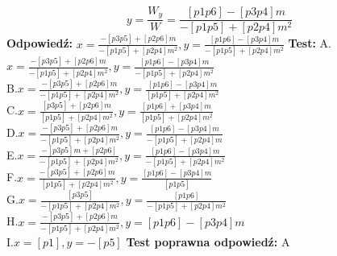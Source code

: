 \documentclass[12pt, a4paper]{article}
\theoremstyle{definition} %
\newcommand{\rozwStop}{\newline}                                            %
\newcommand{\odpStart}{\noindent \textbf{Odpowiedź:}\newline}    %
\newcommand{\odpStop}{\newline}                                             %
\newcommand{\testStart}{\noindent \textbf{Test:}\newline} %
\newcommand{\testStop}{\newline} %
\newcommand{\kluczStart}{\noindent \textbf{Test poprawna odpowiedź:}\newline} %
\newcommand{\kluczStop}{\newline} %
\begin{document}
$$y=\frac{W_{y}}{W}=\frac{[p1p6]-[p3p4]m}{-[p1p5]+[p2p4]m^{2}}$$
\rozwStop
\odpStart
$x=\frac{-[p3p5]+[p2p6]m}{-[p1p5]+[p2p4]m^{2}}, y=\frac{[p1p6]-[p3p4]m}{-[p1p5]+[p2p4]m^{2}}$
\odpStop
\testStart
A.$x=\frac{-[p3p5]+[p2p6]m}{-[p1p5]+[p2p4]m^{2}}, y=\frac{[p1p6]-[p3p4]m}{-[p1p5]+[p2p4]m^{2}}$\\
B.$x=\frac{-[p3p5]+[p2p6]m}{-[p1p5]+[p2p4]m^{2}}, y=\frac{[p1p6]-[p3p4]m}{[p1p5]+[p2p4]m^{2}}$\\
C.$x=\frac{[p3p5]+[p2p6]m}{[p1p5]+[p2p4]m^{2}}, y=\frac{[p1p6]+[p3p4]m}{[p1p5]+[p2p4]m^{2}}$\\
D.$x=\frac{-[p3p5]+[p2p6]m}{-[p1p5]+[p2p4]m^{2}}, y=\frac{[p1p6]-[p3p4]m}{-[p1p5]+[p2p4]m}$\\
E.$x=\frac{-[p3p5]m+[p2p6]}{-[p1p5]+[p2p4]m^{2}}, y=\frac{[p1p6]-[p3p4]m}{-[p1p5]+[p2p4]m^{2}}$\\
F.$x=\frac{-[p3p5]+[p2p6]m}{[p1p5]+[p2p4]m^{2}}, y=\frac{[p1p6]-[p3p4]m}{[p1p5]}$\\
G.$x=\frac{[p3p5]}{-[p1p5]+[p2p4]m^{2}}, y=\frac{[p1p6]}{-[p1p5]+[p2p4]m^{2}}$\\
H.$x=\frac{-[p3p5]+[p2p6]m}{-[p1p5]+[p2p4]m^{2}}, y=[p1p6]-[p3p4]m$\\
I.$x=[p1], y=-[p5]$
\testStop
\kluczStart
A
\kluczStop
\end{document}
